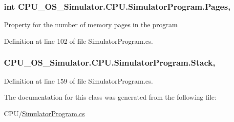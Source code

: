 \subsubsection[{Pages}]{\setlength{\rightskip}{0pt plus 5cm}int C\+P\+U\+\_\+\+O\+S\+\_\+\+Simulator.\+C\+P\+U.\+Simulator\+Program.\+Pages\hspace{0.3cm}{\ttfamily [get]}, {\ttfamily [set]}}\label{class_c_p_u___o_s___simulator_1_1_c_p_u_1_1_simulator_program_aa33b4428956a097dd710948ee51bb5f3}


Property for the number of memory pages in the program 



Definition at line 102 of file Simulator\+Program.\+cs.

\hypertarget{class_c_p_u___o_s___simulator_1_1_c_p_u_1_1_simulator_program_ac6065e57e8d108a0aefd27840f3bf01c}{}
\subsubsection[{Stack}]{ C\+P\+U\+\_\+\+O\+S\+\_\+\+Simulator.\+C\+P\+U.\+Simulator\+Program.\+Stack\hspace{0.3cm}{\ttfamily [get]}, {\ttfamily [set]}}\label{class_c_p_u___o_s___simulator_1_1_c_p_u_1_1_simulator_program_ac6065e57e8d108a0aefd27840f3bf01c}


Definition at line 159 of file Simulator\+Program.\+cs.



The documentation for this class was generated from the following file\+:\begin{DoxyCompactItemize}
\item 
C\+P\+U/\hyperlink{_simulator_program_8cs}{Simulator\+Program.\+cs}\end{DoxyCompactItemize}

